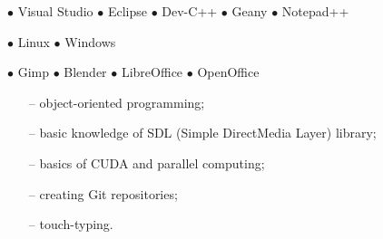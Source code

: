 \documentclass[11pt,a4paper]{article}
\begin{document}
  \bigskip
  
  \medskip
  \centerline{
    \hfill
    $\bullet$ Visual Studio
    \hfill
    $\bullet$ Eclipse
    \hfill
    $\bullet$ Dev-C++
    \hfill
    $\bullet$ Geany
    \hfill
    $\bullet$ Notepad++
    \hfill
  }
  
  \bigskip
  \noindent
  \begin{minipage}[t]{0.35\textwidth}
  
    
    
    \medskip
    \centerline{
      \hfill
      $\bullet$ Linux
      \hfill
      $\bullet$ Windows
      \hfill
    }
  \end{minipage}
  \begin{minipage}[t]{0.65\textwidth}
  
    
    
    \medskip
    \centerline{
      \hfill
      $\bullet$ Gimp
      \hfill
      $\bullet$ Blender
      \hfill
      $\bullet$ LibreOffice
      \hfill
      $\bullet$ OpenOffice
      \hfill
    }
  \end{minipage}
  
  
  \bigskip
  \vspace{-1mm}
  \begin{itemize} \itemsep2pt \parskip0pt 
    \item[--] object-oriented programming;
    \item[--] basic knowledge of SDL (Simple DirectMedia Layer) library;
    \item[--] basics of CUDA and parallel computing;
    \item[--] creating Git repositories;
    \item[--] touch-typing.
  \end{itemize}
  
  
  \vspace{0.3cm}
  
\end{document}
